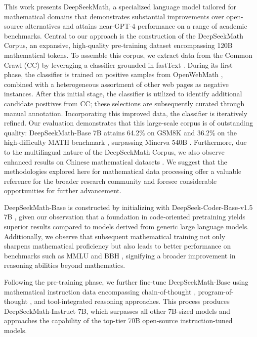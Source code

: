 This work presents DeepSeekMath, a specialized language model tailored for mathematical domains that demonstrates substantial improvements over open-source alternatives and attains near-GPT-4 performance on a range of academic benchmarks. Central to our approach is the construction of the DeepSeekMath Corpus, an expansive, high-quality pre-training dataset encompassing 120B mathematical tokens. To assemble this corpus, we extract data from the Common Crawl (CC) by leveraging a classifier grounded in fastText \citep{joulin2016fasttext}. During its first phase, the classifier is trained on positive samples from OpenWebMath \citep{openwebmath}, combined with a heterogeneous assortment of other web pages as negative instances. After this initial stage, the classifier is utilized to identify additional candidate positives from CC; these selections are subsequently curated through manual annotation. Incorporating this improved data, the classifier is iteratively refined. Our evaluation demonstrates that this large-scale corpus is of outstanding quality: DeepSeekMath-Base 7B attains 64.2\% on GSM8K \citep{gsm8k} and 36.2\% on the high-difficulty MATH benchmark \citep{MATH}, surpassing Minerva 540B \citep{minerva}. Furthermore, due to the multilingual nature of the DeepSeekMath Corpus, we also observe enhanced results on Chinese mathematical datasets \citep{wei2023cmath,agieval}. We suggest that the methodologies explored here for mathematical data processing offer a valuable reference for the broader research community and foresee considerable opportunities for further advancement.

DeepSeekMath-Base is constructed by initializing with DeepSeek-Coder-Base-v1.5 7B \citep{deepseek-coder}, given our observation that a foundation in code-oriented pretraining yields superior results compared to models derived from generic large language models. Additionally, we observe that subsequent mathematical training not only sharpens mathematical proficiency but also leads to better performance on benchmarks such as MMLU \citep{mmlu} and BBH \citep{bbh}, signifying a broader improvement in reasoning abilities beyond mathematics.

Following the pre-training phase, we further fine-tune DeepSeekMath-Base using mathematical instruction data encompassing chain-of-thought \citep{cot}, program-of-thought \citep{pot,pal}, and tool-integrated reasoning \citep{tora} approaches. This process produces DeepSeekMath-Instruct 7B, which surpasses all other 7B-sized models and approaches the capability of the top-tier 70B open-source instruction-tuned models.

